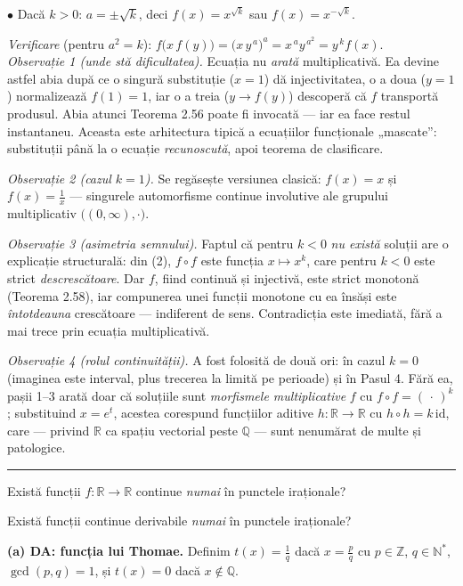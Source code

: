 $\bullet$ Dacă $k>0$: $a=\pm\sqrt k$, deci $f(x)=x^{\sqrt k}$ sau $f(x)=x^{-\sqrt k}$.

\emph{Verificare} (pentru $a^{2}=k$): $f\bigl(x\,f(y)\bigr)=\bigl(x\,y^{\,a}\bigr)^{a}=x^{\,a}y^{\,a^{2}}=y^{\,k}f(x)$. \checkmark\\[2pt]
\emph{Observație 1 (unde stă dificultatea).} Ecuația nu \emph{arată} multiplicativă. Ea devine astfel abia după ce o singură substituție ($x=1$) dă injectivitatea, o a doua ($y=1$) normalizează $f(1)=1$, iar o a treia ($y\to f(y)$) descoperă că $f$ transportă produsul. Abia atunci Teorema 2.56 poate fi invocată --- iar ea face restul instantaneu. Aceasta este arhitectura tipică a ecuațiilor funcționale „mascate'': substituții până la o ecuație \emph{recunoscută}, apoi teorema de clasificare.

\emph{Observație 2 (cazul $k=1$).} Se regăsește versiunea clasică: $f(x)=x$ și $f(x)=\frac1x$ --- singurele automorfisme continue involutive ale grupului multiplicativ $\bigl((0,\infty),\cdot\bigr)$.

\emph{Observație 3 (asimetria semnului).} Faptul că pentru $k<0$ \emph{nu există} soluții are o explicație structurală: din (2), $f\circ f$ este funcția $x\mapsto x^{k}$, care pentru $k<0$ este strict \emph{descrescătoare}. Dar $f$, fiind continuă și injectivă, este strict monotonă (Teorema 2.58), iar compunerea unei funcții monotone cu ea însăși este \emph{întotdeauna} crescătoare --- indiferent de sens. Contradicția este imediată, fără a mai trece prin ecuația multiplicativă.

\emph{Observație 4 (rolul continuității).} A fost folosită de două ori: în cazul $k=0$ (imaginea este interval, plus trecerea la limită pe perioade) și în Pasul 4. Fără ea, pașii 1--3 arată doar că soluțiile sunt \emph{morfismele multiplicative} $f$ cu $f\circ f=(\,\cdot\,)^{k}$; substituind $x=e^{t}$, acestea corespund funcțiilor aditive $h:\mathbb{R}\to\mathbb{R}$ cu $h\circ h=k\,\mathrm{id}$, care --- privind $\mathbb{R}$ ca spațiu vectorial peste $\mathbb{Q}$ --- sunt nenumărat de multe și patologice.
\vspace{1mm}\hrule

\begin{parti}
\item Există funcții $f:\mathbb{R}\to\mathbb{R}$ continue \emph{numai} în punctele iraționale?
\item Există funcții continue derivabile \emph{numai} în punctele iraționale?
\end{parti}
\sol \textbf{(a) DA: funcția lui Thomae.} Definim $t(x)=\frac1q$ dacă $x=\frac pq$ cu $p\in\mathbb{Z}$, $q\in\mathbb{N}^*$, $\gcd(p,q)=1$, și $t(x)=0$ dacă $x\notin\mathbb{Q}$.

